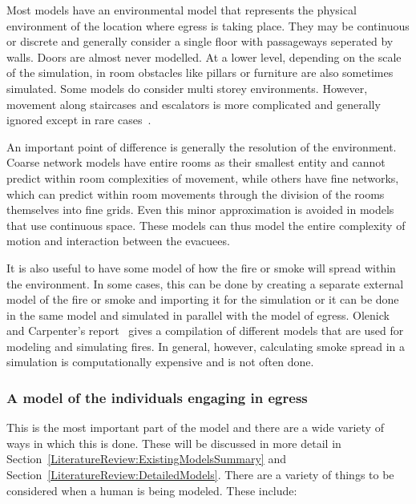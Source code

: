 Most models have an environmental model that represents the physical environment of the location where egress is taking place. They may be continuous or discrete and generally consider a single floor with passageways seperated by walls. Doors are almost never modelled. At a lower level, depending on the scale of the simulation, in room obstacles like pillars or furniture are also sometimes simulated. Some models do consider multi storey environments. However, movement along staircases and escalators is more complicated and generally ignored except in rare cases~\cite{Kinsey:2009tg,Klupfel:2003wa}.


An important point of difference is generally the resolution of the environment. Coarse network models have entire rooms as their smallest entity and cannot predict within room complexities of movement, while others have fine networks, which can predict within room movements through the division of the rooms themselves into fine grids. Even this minor approximation is avoided in models that use continuous space. These models can thus model the entire complexity of motion and interaction between the evacuees.

It is also useful to have some model of how the fire or smoke will spread within the environment. In some cases, this can be done by creating a separate external model of the fire or smoke and importing it for the simulation or it can be done in the same model and simulated in parallel with the model of egress. Olenick and Carpenter's report~\cite{Olenick:2003daa} gives a compilation of different models that are used for modeling and simulating fires. In general, however, calculating smoke spread in a simulation is computationally expensive and is not often done.



\subsubsection{A model of the individuals engaging in egress}

This is the most important part of the model and there are a wide variety of ways in which this is done. These will be discussed in more detail in Section~\ref{LiteratureReview:ExistingModelsSummary} and Section~\ref{LiteratureReview:DetailedModels}. There are a variety of things to be considered when a human is being modeled. These include:

